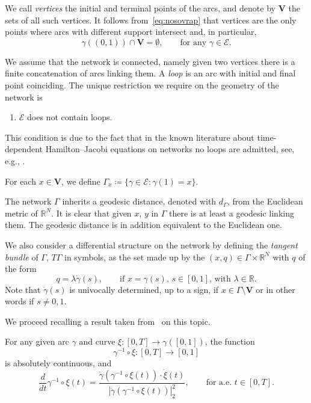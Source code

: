 \documentclass[11pt,a4paper,american]{article}
\newcommand{\Ecal}{\mathcal E}
\newcommand{\Rds}{\mathds R}
\newcommand{\Vbf}{\mathbf V}
\begin{document}
    We call \emph{vertices} the initial and terminal points of the arcs, and denote by $\Vbf$ the sets of all such vertices. It follows from~\cref{eq:nosovrap} that vertices are the only points where arcs with different support intersect and, in particular,
    \begin{equation*}
        \gamma((0,1))\cap\Vbf=\emptyset,\qquad\text{for any }\gamma\in\Ecal.
    \end{equation*}

    We assume that the network is connected, namely given two vertices there is a finite concatenation of arcs linking them. A \emph{loop} is an arc with initial and final point coinciding. The unique restriction we require on the geometry of the network is
    \begin{enumerate}[label=\textbf{(A\arabic*)}]
        \item $\Ecal$ does not contain loops.
    \end{enumerate}
    This condition is due to the fact that in the known literature about time-dependent Hamilton--Jacobi equations on networks no loops are admitted, see, e.g., \cite{ImbertMonneau17,Siconolfi22,LionsSouganidis17}.

    For each $x\in\Vbf$, we define $\Gamma_x\coloneqq\{\gamma\in\Ecal:\gamma(1)=x\}$.

    The network $\Gamma$ inherits a geodesic distance, denoted with $d_\Gamma$, from the Euclidean metric of $\Rds^N$. It is clear that given $x$, $y$ in $\Gamma$ there is at least a geodesic linking them. The geodesic distance is in addition equivalent to the Euclidean one.

    We also consider a differential structure on the network by defining the \emph{tangent bundle} of $\Gamma$, $T\Gamma$ in symbols, as the set made up by the $(x,q)\in\Gamma\times\Rds^N$ with $q$ of the form
    \begin{equation*}
        q=\lambda\dot\gamma(s),\qquad\text{if $x=\gamma(s)$, $s\in[0,1]$, with $\lambda\in\Rds$}.
    \end{equation*}
    Note that $\dot\gamma(s)$ is univocally determined, up to a sign, if $x\in\Gamma\setminus\Vbf$ or in other words if $s\ne0,1$.

    We proceed recalling a result taken from~\cite{PozzaSiconolfi23} on this topic.

    \begin{lem}\label{invarccomp}
        For any given arc $\gamma$ and curve $\xi:[0,T]\to\gamma([0,1])$, the function
        \begin{equation*}
            \gamma^{-1}\circ\xi:[0,T]\to[0,1]
        \end{equation*}
        is absolutely continuous, and
        \begin{equation*}
            \frac d{dt}\gamma^{-1}\circ\xi(t)=\frac{\dot\gamma\left(\gamma^{-1}\circ\xi(t)\right)\cdot\dot\xi(t)}{|\dot\gamma(\gamma^{-1}\circ\xi(t))|_2^2},\qquad\text{for a.e. }t\in[0,T].
        \end{equation*}
    \end{lem}
\end{document}
